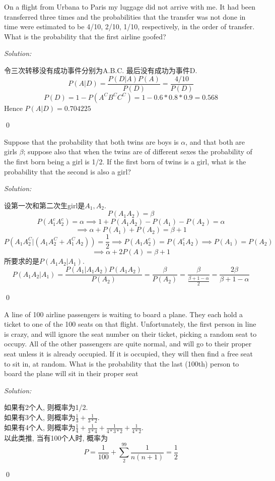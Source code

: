 \documentclass[12pt]{article}
\newenvironment{problem}[2][Problem]{\begin{trivlist}
\item[\hskip \labelsep {\bfseries #1}\hskip \labelsep {\bfseries #2.}]}{\end{trivlist}}
\newenvironment{sol}
    {\emph{Solution:}
    }
    {
    \qed
    }
\newcommand{\f}[2]{\frac{#1}{#2}}                                      %
\newcommand{\ff}[1]{\frac{1}{#1}}                                      %
\newcommand\ip{\implies}                                               %
\renewcommand\a{\alpha}                                                %
\renewcommand\b{\beta}                                                 %
\begin{document}




\begin{problem}{1} 
On a flight from Urbana to Paris my luggage did not arrive with me. It
had been transferred three times and the probabilities that the transfer
was not done in time were estimated to be 4/10, 2/10, 1/10, respectively, in the order of transfer. What is the probability that the first
airline goofed?
\end{problem}
\begin{sol}
令三次转移没有成功事件分别为A.B.C. 最后没有成功为事件D.\\
$$P(A|D) = \f{P(D|A)P(A)}{P(D)} = \f{4/10}{P(D)}$$
$$P(D) = 1-P(A^CB^CC^C) = 1-0.6*0.8*0.9 = 0.568$$
Hence $P(A|D) = 0.704225$
\end{sol}



\begin{problem}{2}
Suppose that the probability that both twins are boys is $\alpha$, and that
both are girls $\beta$; suppose also that when the twins are of different sexes
the probability of the first born being a girl is 1/2. If the first born of
twins is a girl, what is the probability that the second is also a girl?
\end{problem}
\begin{sol}
设第一次和第二次生girl是$A_1,A_2$. 
$$P(A_1A_2) = \b$$
$$P(A_1^cA_2^c) = \a \ip 1 + P(A_1A_2) - P(A_1) - P(A_2)=\a $$
$$\ip \a +P(A_1)+P(A_2) = \b+1$$
$$P(A_1A_2^C|(A_1A_2^C+A_1^CA_2))=\f{1}{2} \ip P(A_1A_2^c) = P(A_1^cA_2) \ip P(A_1) = P(A_2)$$
$$\ip \a +2P(A) = \b+1$$
所要求的是$P(A_1A_2|A_1)$.
$$P(A_1A_2|A_1) = \f{P(A_1|A_1A_2)P(A_1A_2)}{P(A_2)} = \f{\b}{P(A_2)} = \f{\b}{\f{\b+1-\a}{2}} = \f{2\b}{\b+1-\a}$$
\end{sol}

\begin{problem}{3}
A line of 100 airline passengers is waiting to board a plane. They each hold a ticket to one of the 100 seats on that flight. Unfortunately, the first person in line is crazy, and will ignore the seat number on their ticket, picking a random seat to occupy. All of the other passengers are quite normal, and will go to their proper seat unless it is already occupied. If it is occupied, they will then find a free seat to sit in, at random. What is the probability that the last (100th) person to board the plane will sit in their proper seat
\end{problem}
\begin{sol}
如果有2个人, 则概率为1/2.\\ 
如果有3个人, 则概率为$\ff{3}+\ff{3*2}$.\\
如果有4个人, 则概率为$\ff{4}+\ff{3*4}+ \ff{4*3*2}+\ff{4*2}$.\\
以此类推, 当有100个人时, 概率为
$$P = \ff{100} + \sum_2^{99} \ff{n(n+1)} = \ff{2}$$
\end{sol}
\end{document}
